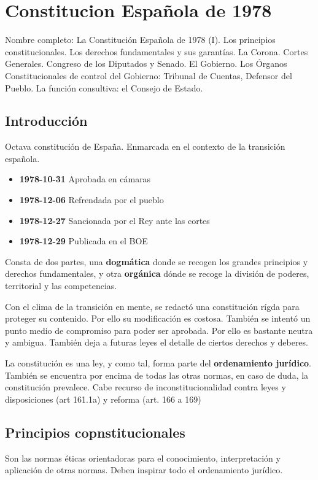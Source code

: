 \setcounter{section}{0}
\section{Constitucion Española de 1978}

Nombre completo: La Constitución Española de 1978 (I). Los principios constitucionales. Los derechos fundamentales y sus garantías. La Corona. Cortes Generales. Congreso de los Diputados y Senado. El Gobierno. Los Órganos Constitucionales de control del Gobierno: Tribunal de Cuentas, Defensor del Pueblo. La función consultiva: el Consejo de Estado.

\localtableofcontents

\subsection{Introducción}
    Octava constitución de España. Enmarcada en el contexto de la transición española.
    \begin{itemize}
        \item \textbf{1978-10-31} Aprobada en cámaras
        \item \textbf{1978-12-06} Refrendada por el pueblo
        \item \textbf{1978-12-27} Sancionada por el Rey ante las cortes
        \item \textbf{1978-12-29} Publicada en el BOE
    \end{itemize}

    Consta de dos partes, una \textbf{dogmática} donde se recogen los grandes principios y derechos fundamentales, y otra \textbf{orgánica} dónde se recoge la división de poderes, territorial y las competencias.

    Con el clima de la transición en mente, se redactó una constitución rígda para proteger su contenido. Por ello su modificación es costosa. También se intentó un punto medio de compromiso para poder ser aprobada. Por ello es bastante neutra y ambigua. También deja a futuras leyes el detalle de ciertos derechos y deberes.

    La constitución es una ley, y como tal, forma parte del \textbf{ordenamiento jurídico}. También se encuentra por encima de todas las otras normas, en caso de duda, la constitución prevalece. Cabe recurso de inconstitucionalidad contra leyes y disposiciones (art 161.1a) y reforma (art. 166 a 169)

\subsection{Principios copnstitucionales}
    Son las normas éticas orientadoras para el conocimiento, interpretación y aplicación de otras normas. Deben inspirar todo el ordenamiento jurídico. 

